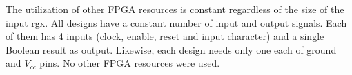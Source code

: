 The utilization of other \gls{FPGA} resources is constant regardless
of the size of the input \gls{rgx}.
%
All designs have a constant number of input and output signals.
Each of them has 4 inputs (clock, enable, reset and input character)
and a single Boolean result as output.
Likewise, each design needs only one each of ground and $V_{cc}$ pins.
No other \gls{FPGA} resources were used.







